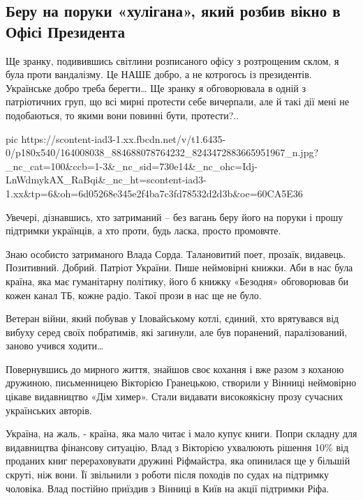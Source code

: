  
 
 
 
 
\subsection{Беру на поруки «хулігана», який розбив вікно в Офісі Президента}

Ще зранку, подивившись світлини розписаного офісу з розтрощеним склом, я була
проти вандалізму. Це НАШЕ добро, а не котрогось із президентів. Українське
добро треба берегти… Ще зранку я обговорювала в одній з патріотичних груп, що
всі мирні протести себе вичерпали, але й такі дії мені не подобаються, то якими
вони повинні бути, протести?..

\ifcmt
  pic https://scontent-iad3-1.xx.fbcdn.net/v/t1.6435-0/p180x540/164008038_884688078764232_8243472883665951967_n.jpg?_nc_cat=100&ccb=1-3&_nc_sid=730e14&_nc_ohc=Idj-LnWdmykAX_RaBqi&_nc_ht=scontent-iad3-1.xx&tp=6&oh=6d05268e345e2f4ba7c3fd78532d2d3b&oe=60CA5E36
\fi

Увечері, дізнавшись, хто затриманий – без вагань беру його на поруки і прошу
підтримки українців, а хто проти, будь ласка, просто промовчте. 

Знаю особисто затриманого Влада Сорда. Талановитий поет, прозаїк, видавець.
Позитивний. Добрий. Патріот України. Пише неймовірні книжки. Аби в нас була
країна, яка має гуманітарну політику, його б книжку «Безодня» обговорював би
кожен канал ТБ, кожне радіо. Такої прози в нас ще не було. 

Ветеран війни, який побував у Іловайському котлі, єдиний, хто врятувався від
вибуху серед своїх побратимів, які загинули, але був поранений, паралізований,
заново учився ходити… 

Повернувшись до мирного життя, знайшов своє кохання і вже разом з коханою
дружиною, письменницею Вікторією Гранецькою, створили у Вінниці неймовірно
цікаве видавництво «Дім химер». Стали видавати високоякісну прозу сучасних
українських авторів.

Україна, на жаль, - країна, яка мало читає і мало купує книги. Попри складну
для видавництва фінансову ситуацію, Влад з Вікторією ухвалюють рішення 10\% від
проданих книг перераховувати дружині Ріфмайстра, яка опинилася ще у більшій
скруті, ніж вони. Її звільнили з роботи після  походів по судах на підтримку
чоловіка. Влад постійно приїздив з Вінниці в Київ на акції підтримки Ріфа.

